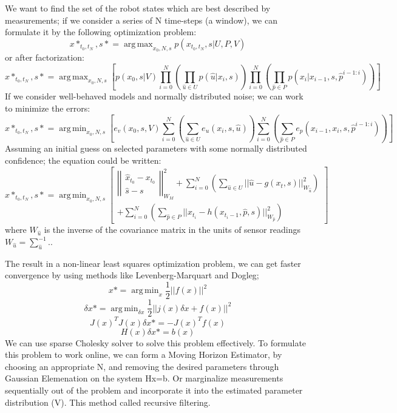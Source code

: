 \documentclass[a4paper,12pt]{article}
\DeclareMathOperator*{\argmin}{arg\,min}
\DeclareMathOperator*{\argmax}{arg\,max}
\begin{document}
We want to find the set of the robot states which are best described by measurements; if we consider a series of N time-steps (a window), we can formulate it by the following optimization problem: 
$${x*_{t_0,t_N},s*}=\argmax_{x_0,N,s}p(x_{t_0,t_N},s|U,P,V)$$
or after factorization:
$${x*_{t_0,t_N},s*}=\argmax_{x_0,N,s}\left[ p(x_0,s|V) \prod_{i=0}^N \left(\prod_{\hat{u}\in U} p(\hat{u}|x_i,s)\right) \prod_{i=0}^N \left(\prod_{\hat{p}\in P} p(x_i|x_{i-1},s,\hat{p}^{i-1:i})\right) \right]$$
If we consider well-behaved models and normally distributed noise; we can work to minimize the errors:
$${x*_{t_0,t_N},s*}=\argmin_{x_0,N,s}\left[ e_v(x_0,s,V) \sum_{i=0}^N \left(\sum_{\hat{u}\in U} e_u(x_i,s,\hat{u})\right) \sum_{i=0}^N \left(\sum_{\hat{p}\in P} e_p(x_{i-1},x_i,s,\hat{p}^{i-1:i})\right) \right]$$
Assuming an initial guess on selected parameters with some normally distributed confidence; the equation could be written:
$${x*_{t_0,t_N},s*}=\argmin_{x_0,N,s}\left[ \begin{split}
\left|\left|\begin{matrix}\hat{x}_{t_0}-x_{t_0}\\ \hat{s} - s\end{matrix}\right|\right|^2_{W_M}+\sum^N_{i=0}\left(\sum_{\hat{u}\in U} ||\hat{u}-g(x_t,s)||^2_{W_{\hat{u}}}\right)\\+\sum^N_{i=0}\left(\sum_{\hat{p}\in P} ||x_{t_i}-h(x_{t_i-1},\hat{p},s)||^2_{W_{\hat{p}}}\right)
\end{split}
\right]$$
where $W_{\hat{u}}$ is the inverse of the covariance matrix in the units of sensor readings $W_{\hat{u}}=\sum^{-1}_{\hat{u}}$..

The result in a non-linear least squares optimization problem, we can get faster convergence by using methods like Levenberg-Marquart and Dogleg;
$$x*=\argmin_x \frac{1}{2}||f(x)||^2$$
$$\delta x*=\argmin_{\delta x}\frac{1}{2}||j(x)\delta x +f(x)||^2$$
$$J(x)^T J(x)\delta x*=-J(x)^T f(x)$$
$$H(x) \delta x*=b(x)$$
We can use sparse Cholesky solver to solve this problem effectively.
\newpage
To formulate this problem to work online, we can form a Moving Horizon Estimator, by choosing an appropriate N, and removing the desired parameters through Gaussian Elemenation on the system Hx=b.
Or marginalize measurements sequentially out of the problem and incorporate it into the estimated parameter distribution (V). This method called recursive filtering.
\end{document}
